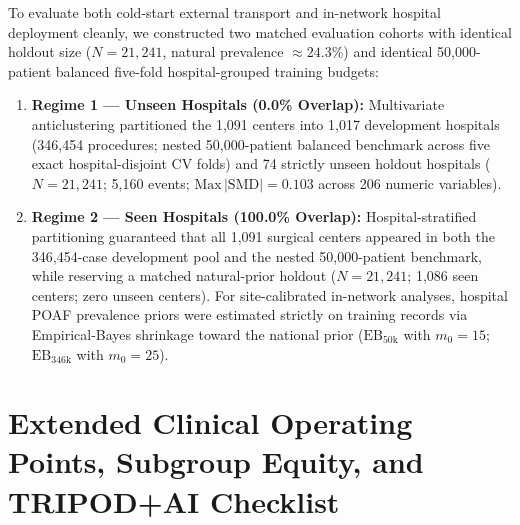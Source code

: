 To evaluate both cold-start external transport and in-network hospital deployment cleanly, we constructed two matched evaluation cohorts with identical holdout size ($N{=}21{,}241$, natural prevalence $\approx 24.3\%$) and identical 50,000-patient balanced five-fold hospital-grouped training budgets:
\begin{enumerate}
  \item \textbf{Regime 1 — Unseen Hospitals (0.0\% Overlap):} Multivariate anticlustering partitioned the 1,091 centers into 1,017 development hospitals (346,454 procedures; nested 50,000-patient balanced benchmark across five exact hospital-disjoint CV folds) and 74 strictly unseen holdout hospitals ($N{=}21{,}241$; 5,160 events; $\mathrm{Max}\,|\mathrm{SMD}|=0.103$ across 206 numeric variables).\cite{papenberg2021anticlustering,joseph2022split}
  \item \textbf{Regime 2 — Seen Hospitals (100.0\% Overlap):} Hospital-stratified partitioning guaranteed that all 1,091 surgical centers appeared in both the 346,454-case development pool and the nested 50,000-patient benchmark, while reserving a matched natural-prior holdout ($N{=}21{,}241$; 1,086 seen centers; zero unseen centers). For site-calibrated in-network analyses, hospital POAF prevalence priors were estimated strictly on training records via Empirical-Bayes shrinkage toward the national prior ($\mathrm{EB}_{50\mathrm{k}}$ with $m_0{=}15$; $\mathrm{EB}_{346\mathrm{k}}$ with $m_0{=}25$).
\end{enumerate}

\section{Extended Clinical Operating Points, Subgroup Equity, and TRIPOD+AI Checklist}




